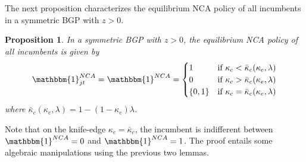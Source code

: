 \documentclass[11pt,english]{article}
\newtheorem{proposition}{Proposition}
\begin{document}
The next proposition characterizes the equilibrium NCA policy of all incumbents in a symmetric BGP with $z > 0$. 

\begin{proposition}\label{proposition:optimalNCApolicy}
	In a symmetric BGP with $z > 0$, the equilibrium NCA policy of all incumbents is given by 
	\begin{align}
	\mathbbm{1}^{NCA}_{jt} = \mathbbm{1}^{NCA} = \begin{cases}
	1 & \textrm{if } \kappa_{c} < \bar{\kappa}_c (\kappa_e, \lambda) \\
	0 & \textrm{if } \kappa_{c} > \bar{\kappa}_c (\kappa_e, \lambda)\\
	\{0,1\} & \textrm{if } \kappa_c = \bar{\kappa}_c (\kappa_e, \lambda) 
	\end{cases} \label{eq_nca_policy}
	\end{align}
	where $\bar{\kappa}_c (\kappa_e, \lambda) = 1 - (1-\kappa_e)\lambda$.

\end{proposition}

Note that on the knife-edge $\kappa_c = \bar{\kappa}_c$, the incumbent is indifferent between $\mathbbm{1}^{NCA} = 0$ and $\mathbbm{1}^{NCA} = 1$. The proof entails some algebraic manipulations using the previous two lemmas. 
\end{document}
